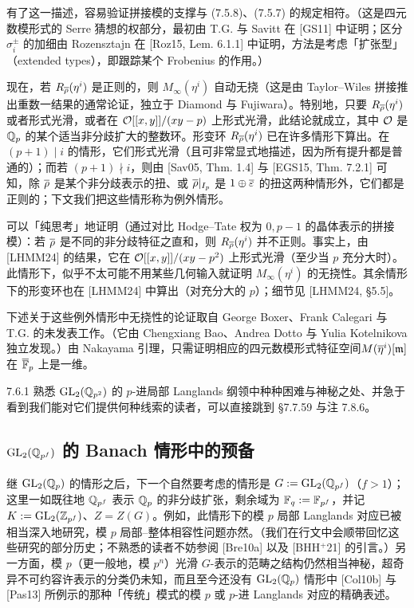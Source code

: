 有了这一描述，容易验证拼接模的支撑与 (7.5.8)、(7.5.7) 的规定相符。（这是四元数模形式的 Serre 猜想的权部分，最初由 T.G. 与 Savitt 在 [GS11] 中证明；区分 $\sigma_i^{\pm}$ 的加细由 Rozensztajn 在 [Roz15, Lem. 6.1.1] 中证明，方法是考虑「扩张型」（extended types），即跟踪某个 Frobenius 的作用。）

现在，若 $R_{\overline{\rho}}(\eta^{i})$ 是正则的，则 $M_\infty(\eta^{i})$ 自动无挠（这是由 Taylor--Wiles 拼接推出重数一结果的通常论证，独立于 Diamond 与 Fujiwara）。特别地，只要 $R_{\overline{\rho}}(\eta^{i})$ 或者形式光滑，或者在 $\mathcal{O}[[x,y]]/(xy-p)$ 上形式光滑，此结论就成立，其中 $\mathcal{O}$ 是 $\mathbb{Q}_p$ 的某个适当非分歧扩大的整数环。形变环 $R_{\overline{\rho}}(\eta^{i})$ 已在许多情形下算出。在 $(p+1)\mid i$ 的情形，它们形式光滑（且可非常显式地描述，因为所有提升都是普通的）；而若 $(p+1)\nmid i$，则由 [Sav05, Thm. 1.4] 与 [EGS15, Thm. 7.2.1] 可知，除 $\overline{\rho}$ 是某个非分歧表示的扭、或 $\overline{\rho}|_{I_p}$ 是 $1\oplus\overline{\varepsilon}$ 的扭这两种情形外，它们都是正则的；下文我们把这些情形称为例外情形。

可以「纯思考」地证明（通过对比 Hodge--Tate 权为 $0,p-1$ 的晶体表示的拼接模）：若 $\overline{\rho}$ 是不同的非分歧特征之直和，则 $R_{\overline{\rho}}(\eta^{i})$ 并不正则。事实上，由 [LHMM24] 的结果，它在 $\mathcal{O}[[x,y]]/(xy-p^2)$ 上形式光滑（至少当 $p$ 充分大时）。此情形下，似乎不太可能不用某些几何输入就证明 $M_\infty(\eta^{i})$ 的无挠性。其余情形下的形变环也在 [LHMM24] 中算出（对充分大的 $p$）；细节见 [LHMM24, §5.5]。

下述关于这些例外情形中无挠性的论证取自 George Boxer、Frank Calegari 与 T.G. 的未发表工作。（它由 Chengxiang Bao、Andrea Dotto 与 Yulia Kotelnikova 独立发现。）由 Nakayama 引理，只需证明相应的四元数模形式特征空间$M(\overline{\eta}^{i})[\mathfrak{m}]$ 在 $\overline{\mathbb{F}}_p$ 上是一维。

\begin{rem}{7.6.1}\label{thm:a4-7-6-1}
熟悉 $\mathrm{GL}_2(\mathbb{Q}_{p^2})$ 的 $p$-进局部 Langlands 纲领中种种困难与神秘之处、并急于看到我们能对它们提供何种线索的读者，可以直接跳到 §7.7.59 与注 7.8.6。
\end{rem}

\subsection{$\mathrm{GL}_2(\mathbb{Q}_{p^f})$ 的 Banach 情形中的预备}
继 $\mathrm{GL}_2(\mathbb{Q}_p)$ 的情形之后，下一个自然要考虑的情形是 $G:=\mathrm{GL}_2(\mathbb{Q}_{p^f})$（$f>1$）；这里一如既往地 $\mathbb{Q}_{p^f}$ 表示 $\mathbb{Q}_p$ 的非分歧扩张，剩余域为 $\mathbb{F}_q:=\mathbb{F}_{p^f}$，并记 $K:=\mathrm{GL}_2(\mathbb{Z}_{p^f})$、$Z=Z(G)$。例如，此情形下的模 $p$ 局部 Langlands 对应已被相当深入地研究，模 $p$ 局部--整体相容性问题亦然。（我们在行文中会顺带回忆这些研究的部分历史；不熟悉的读者不妨参阅 [Bre10a] 以及 [BHH$^{+}$21] 的引言。）另一方面，模 $p$（更一般地，模 $p^n$）光滑 $G$-表示的范畴之结构仍然相当神秘，超奇异不可约容许表示的分类仍未知，而且至今还没有 $\mathrm{GL}_2(\mathbb{Q}_p)$ 情形中 [Col10b] 与 [Pas13] 所例示的那种「传统」模式的模 $p$ 或 $p$-进 Langlands 对应的精确表述。

